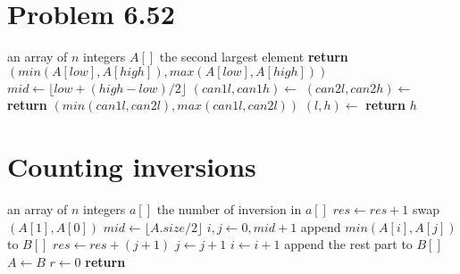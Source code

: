 \documentclass[a4paper]{article}
\begin{document}
\begin{spacing}{1.3}
\section*{Problem 6.52}
\begin{algorithmic}[1]
\Require an array of $n$ integers $A[]$
\Ensure the second largest element
    \State \textbf{return} $(min(A[low],A[high]),max(A[low],A[high]))$
\Else {}
    \State $mid\gets \lfloor low+(high-low)/2 \rfloor$
    \State $(can1l,can1h)\gets$ 
    \State $(can2l,can2h)\gets$ 
    \State \textbf{return} $(min(can1l,can2l),max(can1l,can2l))$
\EndIf
\EndFunction
\State $(l,h)\gets$ 
\State \textbf{return} $h$
\end{algorithmic}

\section*{Counting inversions}
\begin{algorithmic}[1]
\Require an array of $n$ integers $a[]$
\Ensure the number of inversion in $a[]$
\State $res\gets res+1$
\State swap$(A[1],A[0])$
\EndIf
\Else
  \State $mid\gets \lfloor A.size/2\rfloor$
  \State {}
  \State {}
  \State $i,j\gets 0,mid+1$ 
    \State append $min(A[i],A[j])$ to $B[]$ 
     
      \State $res\gets res+(j+1)$ 
      \State $j\gets j+1$
    \Else
      \State $i\gets i+1$
    \EndIf
  \EndWhile
  \State append the rest part to $B[]$ 
  \State $A\gets B$
\EndIf
\EndFunction
\State $r\gets 0$ 
\State \textbf{return} 
\end{algorithmic}


\end{spacing}
\end{document}
